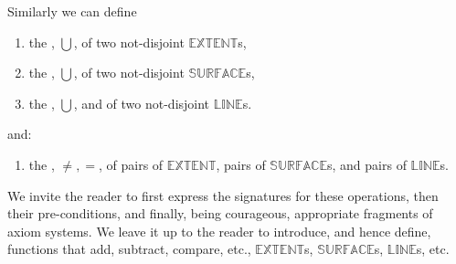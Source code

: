 \noindent
\pind Similarly we can define
\begin{enumerate}\setei
\item \label{spa-attr-0100} the , $\bigcup$, of two
  not-disjoint $\mathbb{EXTENT}$s,
\item \label{spa-attr-0110} the , $\bigcup$, of two
  not-disjoint $\mathbb{SURFACE}$s,
\item \label{spa-attr-0120} the , $\bigcup$, and of two
  not-disjoint $\mathbb{LINE}$s.
\savei\end{enumerate}
\pos{\psno}{\mnewfoil}
\pind and:
\begin{enumerate}\setei
\item \label{spa-attr-0130} the , $\neq, =$, of \nyl
  pairs of $\mathbb{EXTENT}$, \nyl pairs of $\mathbb{SURFACE}$s, and \nyl pairs
  of $\mathbb{LINE}$s. 
\savei\end{enumerate}
\noindent
\pind We invite the reader to \ysfchg{}
\begynd
\pind first express the signatures for these operations,
\pind then their pre-conditions,
\pind and finally, being courageous, appropriate fragments of axiom systems.
\afslut
\afslut
\begynd
\pind We leave it up to the reader to introduce, \nyl
      and hence define, functions that
\begynd
\pind \textsf{add, subtract, compare,} etc., 
\pind $\mathbb{EXTENT}$s, $\mathbb{SURFACE}$s, $\mathbb{LINE}$s, etc.
\afslut
\afslut

